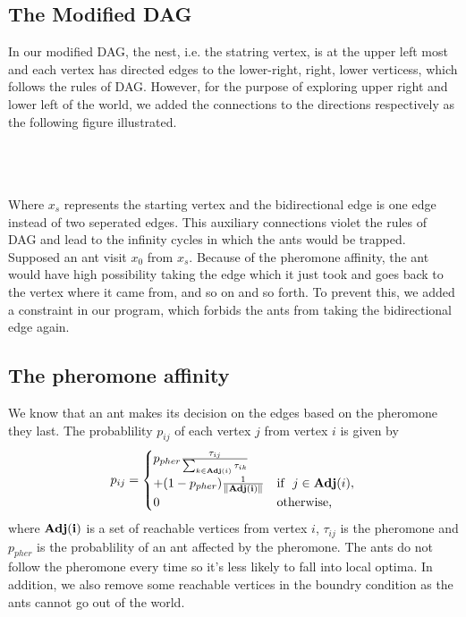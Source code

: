 \documentclass[12pt,journal,compsoc]{IEEEtran}
\begin{document}
\subsection{The Modified DAG}
In our modified DAG, the nest, i.e. the statring vertex, is at the upper left most and each vertex has directed edges to the lower-right, right, lower verticess, which follows the rules of DAG. However, for the purpose of exploring upper right and lower left of the world, we added the connections to the directions respectively as the following figure illustrated.\\\\
\\\\
Where $x_s$ represents the starting vertex and the bidirectional edge is one edge instead of two seperated edges. This auxiliary connections violet the rules of DAG and lead to the infinity cycles in which the ants would be trapped. Supposed an ant visit $x_0$ from $x_s$. Because of the pheromone affinity, the ant would have high possibility taking the edge which it just took and goes back to the vertex where it came from, and so on and so forth. To prevent this, we added a constraint in our program, which forbids the ants from taking the bidirectional edge again.

\subsection{The pheromone affinity}
We know that an ant makes its decision on the edges based on the pheromone they last. The probablility $p_{ij}$ of each vertex $j$ from vertex $i$ is given by
\[p_{ij}=\begin{cases} p_{pher}{\tau_{ij}\over \sum\nolimits_{k\in {\bf Adj}(i)}\tau_{ik}}\\ + (1-p_{pher}){1\over\|\bf Adj(i)\|} &\mbox{if }\ j\in {\bf Adj}(i), \\
0 & \mbox{otherwise,}\end{cases}\]
where $\bf Adj(i)$ is a set of reachable vertices from vertex $i$, $\tau_{ij}$ is the pheromone and $p_{pher}$ is the probablility of an ant affected by the pheromone. The ants do not follow the pheromone every time so it's less likely to fall into local optima. In addition, we also remove some reachable vertices in the boundry condition as the ants cannot go out of the world.
\end{document}
